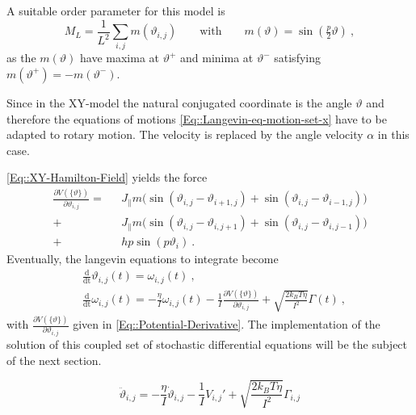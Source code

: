 	A suitable order parameter for this model is 
	\begin{equation} \label{Eq::Si-Order-Param}
		M_L =	\frac{1}{L^2} \sum_{i,j} m(\vartheta_{i, j}) \qquad \text{with} \qquad	m(\vartheta) =	\sin \left(\tfrac{p}{2} \vartheta\right) ~,
	\end{equation}
	as the $m(\vartheta)$ have maxima at $\vartheta^{+}$ and minima at $\vartheta^{-}$ satisfying $m(\vartheta^+) =	- m (\vartheta^-)$.
	
	Since in the XY-model the natural conjugated coordinate is the angle $\vartheta$ and therefore the equations of motions \autoref{Eq::Langevin-eq-motion-set-x} have to be adapted to rotary motion. The velocity is replaced by the angle velocity $\alpha$ in this case.
	
	\autoref{Eq::XY-Hamilton-Field} yields the force
	\begin{equation} \label{Eq::Potential-Derivative}
		\begin{split}
			\frac{\partial V(\{\vartheta\})}{\partial \vartheta_{i, j}} = ~~~& J_\parallel m \Big( \sin \left(\vartheta_{i,j} - \vartheta_{i + 1, j} \right) +   \sin \left(\vartheta_{i,j} - \vartheta_{i-1, j} \right) \Big)	 \\
			+ &J_\parallel m \Big( \sin \left(\vartheta_{i,j} - \vartheta_{i, j+1} \right) +  \sin \left(\vartheta_{i,j} - \vartheta_{i, j-1} \right) \Big) \\
			+ &h p \sin(p\vartheta_i)~.
		\end{split}
	\end{equation}
	Eventually, the langevin equations to integrate become
	\begin{align}
		&\frac{\text{d}}{\text{dt}} \vartheta_{i,j}(t) =	 \omega_{i,j}(t)~, \label{Eq::Si-Langevin-theta} \\
		&\frac{\text{d}}{\text{dt}} \omega_{i,j}(t) =	- \frac{\eta}{I} \omega_{i,j}(t) - \frac{1}{I}\frac{\partial V(\{\vartheta\})}{\partial \vartheta_{i,j}} + \sqrt{\frac{2 k_B T \eta}{I^2}} \Gamma(t)~, \label{Eq::Si-Langevin-omega}
	\end{align}
	with $\frac{\partial V(\{\vartheta\})}{\partial \vartheta_{i,j}}$ given in \autoref{Eq::Potential-Derivative}. The implementation of the solution of this coupled set of stochastic differential equations will be the subject of the next section.
	
	\begin{equation}
		\ddot{\vartheta}_{i, j} =	- \frac{\eta}{I} \dot{\vartheta}_{i, j} - \frac{1}{I} V_{i,j}' + \sqrt{\frac{2 k_B T \eta}{I^2}} \Gamma_{i,j}
	\end{equation}
